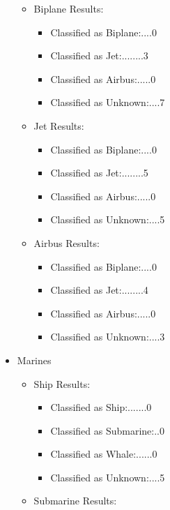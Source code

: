 \documentclass{article}
\begin{document}
\begin{itemize}
\begin{itemize}
            \item Biplane Results:
                \begin{itemize}
                    \item Classified as Biplane:....0
                    \item Classified as Jet:........3
                    \item Classified as Airbus:.....0
                    \item Classified as Unknown:....7
                \end{itemize}
            \item Jet Results:
                \begin{itemize}
                    \item Classified as Biplane:....0
                    \item Classified as Jet:........5
                    \item Classified as Airbus:.....0
                    \item Classified as Unknown:....5
                \end{itemize}
            \item Airbus Results:
                \begin{itemize}
                    \item Classified as Biplane:....0
                    \item Classified as Jet:........4
                    \item Classified as Airbus:.....0
                    \item Classified as Unknown:....3
                \end{itemize}
        \end{itemize}
    \item Marines
        \begin{itemize}
            \item Ship Results:
                \begin{itemize}
                    \item Classified as Ship:.......0
                    \item Classified as Submarine:..0
                    \item Classified as Whale:......0
                    \item Classified as Unknown:....5
                \end{itemize}
            \item Submarine Results:

\end{itemize}
\end{itemize}
\end{document}
